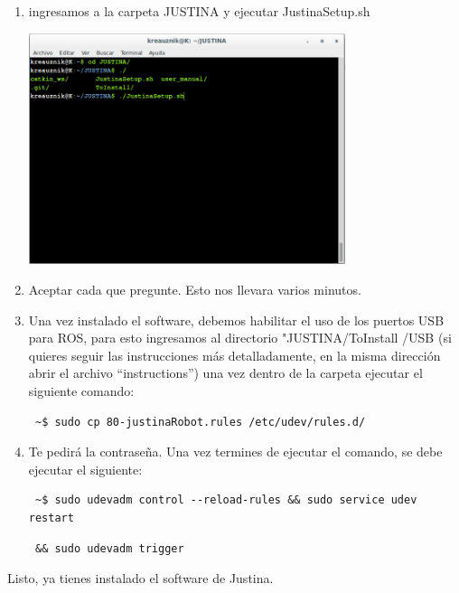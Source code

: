 \documentclass[user_manual.tex]{subfiles}
\begin{document}
\begin{enumerate}
 \item ingresamos a la carpeta JUSTINA y ejecutar JustinaSetup.sh
  \begin{center}
\includegraphics[width=0.73\textwidth]{Figures/PP/pp4.png}
\end{center}
 \item Aceptar cada que pregunte. Esto nos llevara varios minutos.
 \item Una vez instalado el software, debemos habilitar el uso de los puertos USB para ROS, para esto ingresamos al directorio "JUSTINA/ToInstall
 /USB (si quieres seguir las instrucciones más detalladamente, en la misma dirección abrir el archivo ``instructions'') una vez dentro
 de la carpeta ejecutar el siguiente comando:

\begin{verbatim}
 ~$ sudo cp 80-justinaRobot.rules /etc/udev/rules.d/
\end{verbatim}
 
 \item Te pedirá la contraseña. Una vez termines de ejecutar el comando, se debe ejecutar el siguiente: 
 
\begin{verbatim}
 ~$ sudo udevadm control --reload-rules && sudo service udev restart
\end{verbatim}
\begin{verbatim}
 && sudo udevadm trigger
\end{verbatim}

 
\end{enumerate}
Listo, ya tienes instalado el software de Justina.
\end{document}
